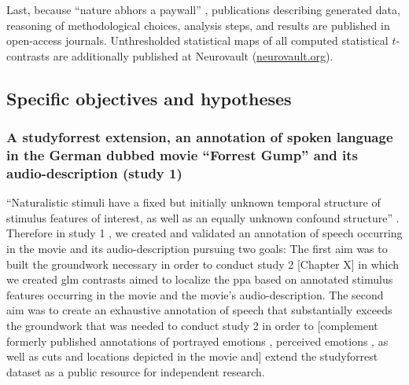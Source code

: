 Last, because ``nature abhors a paywall'' \citep{dupre2020nature}, publications
describing generated data, reasoning of methodological choices, analysis steps,
and results are published in open-access journals.
Unthresholded statistical maps of all computed statistical $t$-contrasts are
additionally published at Neurovault
(\href{https://neurovault.org/}{neurovault.org}).


\subsection{Specific objectives and hypotheses}



\subsubsection{A studyforrest extension, an annotation of spoken
language in the German dubbed movie ``Forrest Gump'' and its audio-description
(study 1)}

``Naturalistic stimuli have a fixed but initially unknown temporal structure of
stimulus features of interest, as well as an equally unknown confound
structure'' \citep{haeusler2021speechanno}.
Therefore in study 1 \citep{haeusler2021speechanno}, we created and validated an
annotation of speech occurring in the movie and its audio-description pursuing
two goals:
The first aim was to built the groundwork necessary in order to conduct study 2
[Chapter X] in which we created \ac{glm} contrasts aimed to localize the
\ac{ppa} based on annotated stimulus features occurring in the movie and the
movie's audio-description.
The second aim was to create an exhaustive annotation of speech that
substantially exceeds the groundwork that was needed to conduct study 2 in order
to [complement formerly published annotations of portrayed emotions
\citep{labs2015portrayed}, perceived emotions \citep{lettieri2019emotionotopy},
as well as cuts and locations depicted in the movie \citep{haeusler2016cutanno}
and] extend the studyforrest dataset as a public resource for independent
research.

